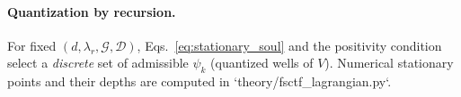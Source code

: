 \paragraph{Quantization by recursion.}
For fixed $(d,\lambda_r,\mathcal G,\mathcal D)$, Eqs.~\eqref{eq:stationary_soul} and the positivity
condition select a \emph{discrete} set of admissible $\psi_k$ (quantized wells of $V$).
Numerical stationary points and their depths are computed in `theory/fsctf_lagrangian.py`.


